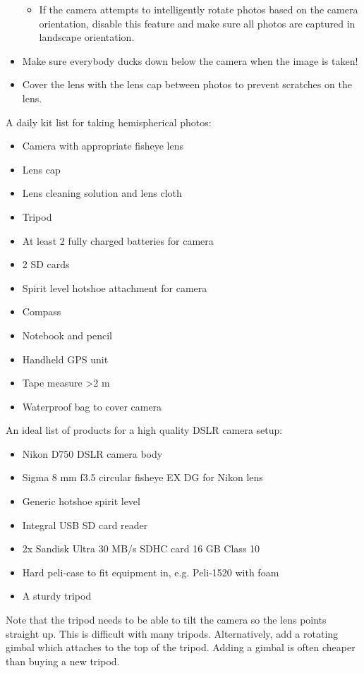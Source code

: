 \documentclass[11pt,a4paper]{article}
\begin{document}
\begin{itemize}
\begin{itemize}
			\item{If the camera attempts to intelligently rotate photos based on the camera orientation, disable this feature and make sure all photos are captured in landscape orientation.}
		\end{itemize}
	\item{Make sure everybody ducks down below the camera when the image is taken!}
	\item{Cover the lens with the lens cap between photos to prevent scratches on the lens.}
\end{itemize}

A daily kit list for taking hemispherical photos:

\begin{itemize}
	\item{Camera with appropriate fisheye lens}
	\item{Lens cap}
	\item{Lens cleaning solution and lens cloth}
	\item{Tripod}
	\item{At least 2 fully charged batteries for camera}
	\item{2 SD cards}
	\item{Spirit level hotshoe attachment for camera}
	\item{Compass}
	\item{Notebook and pencil}
	\item{Handheld GPS unit}
	\item{Tape measure >2 m}
	\item{Waterproof bag to cover camera}
\end{itemize}

An ideal list of products for a high quality DSLR camera setup:

\begin{itemize}
	\item{Nikon D750 DSLR camera body}
	\item{Sigma 8 mm f3.5 circular fisheye EX DG for Nikon lens}
	\item{Generic hotshoe spirit level}
	\item{Integral USB SD card reader}
	\item{2x Sandisk Ultra 30 MB/s SDHC card 16 GB Class 10}
	\item{Hard peli-case to fit equipment in, e.g. Peli-1520 with foam}
	\item{A sturdy tripod}
\end{itemize}

Note that the tripod needs to be able to tilt the camera so the lens points straight up. This is difficult with many tripods. Alternatively, add a rotating gimbal which attaches to the top of the tripod. Adding a gimbal is often cheaper than buying a new tripod.
\end{document}
